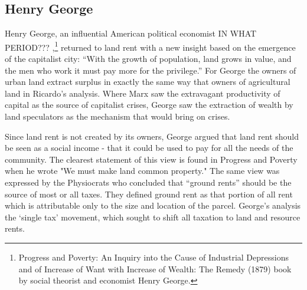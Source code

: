 \subsection{Henry George} 


  Henry George, an influential American political economist IN WHAT PERIOD??? ,\footnote{Progress and Poverty: An Inquiry into the Cause of Industrial Depressions and of Increase of Want with Increase of Wealth: The Remedy (1879) book by social theorist and economist Henry George.}  returned to land rent with a new insight based on the emergence of the capitalist city: ``With the growth of population, land grows in value, and the men who work it must pay more for the privilege.'' For George the owners of urban land extract surplus in exactly the same way that owners of agricultural land in Ricardo's analysis. %
  Where Marx saw the extravagant productivity of capital as the source of capitalist crises, George saw the extraction of wealth by land speculators as the mechanism that would bring on crises.
  
  Since land rent is not created by its owners, George argued that land rent should be seen as a social income - that it could be used to pay for all the needs of the community. The clearest statement of this view is found in Progress and Poverty when he wrote "We must make land common property." The same view was expressed by the Physiocrats who concluded  that ``ground rents'' should be the source of most or all taxes. They defined ground rent as that portion of all rent which is attributable only to the size and location of the parcel. George's analysis the `single tax' movement, which sought to shift all taxation to land  and resource rents.   

